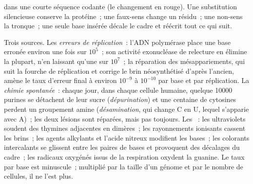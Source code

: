 \begin{omfigure}

{\small {} dans une courte séquence codante (le
changement en rouge). Une substitution silencieuse conserve la
protéine~; une  faux-sens change un résidu~; une 
non-sens la tronque~; une seule base insérée décale le cadre et réécrit
tout ce qui suit.}
\end{omfigure}

\begin{proposition}\label{prop:b2:genome-diversification:sources}
Trois sources. Les \emph{erreurs de réplication}~: l'ADN polymérase
place une base erronée environ une fois sur $10^{5}$~; son activité
exonucléase de relecture en élimine la plupart, n'en laissant qu'une
sur $10^{7}$~; la réparation des mésappariements, qui suit la fourche
de réplication et corrige le brin néosynthétisé d'après l'ancien, amène
le taux d'erreur final à environ $10^{-9}$ à $10^{-10}$ par base et par
réplication. La \emph{chimie spontanée}~: chaque jour, dans chaque
cellule humaine, quelque \num{10000} purines se détachent de leur sucre
(\emph{dépurination}) et une centaine de cytosines perdent un
groupement amine (\emph{désamination}, qui change C en U, lequel
s'apparie avec A)~; les deux lésions sont réparées, mais pas toujours.
Les \emph{}~: les ultraviolets soudent des thymines
adjacentes en dimères~; les rayonnements ionisants cassent les brins~;
les agents alkylants et l'acide nitreux modifient les bases~; les
colorants intercalants se glissent entre les paires de bases et
provoquent des décalages du cadre~; les radicaux oxygénés issus de la
respiration oxydent la guanine. Le taux par base est minuscule~;
multiplié par la taille d'un génome et par le nombre de cellules, il
ne l'est plus.
\end{proposition}

